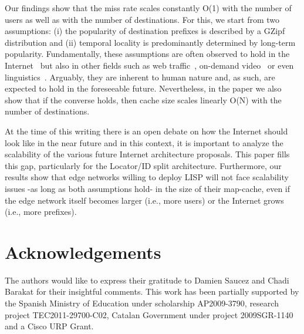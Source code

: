 \documentclass[twocolumn, 10pt]{article}
\theoremstyle{plain}
\begin{document}
Our findings show that the miss rate scales constantly O(1) with the number of
users as well as with the number of destinations. For this, we start from two
assumptions: (i) the popularity of destination prefixes is described by a
GZipf distribution and (ii) temporal locality is predominantly determined by
long-term popularity. Fundamentally, these assumptions are often observed to
hold in the Internet~\cite{sarrar:leverage_zipf, kim:rcaching} but also in
other fields such as web traffic~\cite{breslau:web_and_zipf}, on-demand
video~\cite{cha:itube} or even linguistics~\cite{zipf:principle_least_effort}.
Arguably, they are inherent to human nature and, as such, are expected to hold
in the foreseeable future. Nevertheless, in the paper we also show that if the
converse holds, then cache size scales linearly O(N) with the number of
destinations.

At the time of this writing there is an open debate on how the Internet should
look like in the near future and in this context, it is important to analyze
the scalability of the various future Internet architecture proposals. This
paper fills this gap, particularly for the Locator/ID split architecture.
Furthermore, our results show that edge networks willing to deploy LISP will
not face scalability issues -as long as both assumptions hold- in the size of
their map-cache, even if the edge network itself becomes larger (i.e., more
users) or the Internet grows (i.e., more prefixes).
 
\section*{Acknowledgements} 
The authors would like to express their gratitude to Damien Saucez and Chadi
Barakat for their insightful comments. This work has been partially supported
by the Spanish Ministry of Education under scholarship AP2009-3790, research
project TEC2011-29700-C02, Catalan Government under project 2009SGR-1140 and a
Cisco URP Grant.
\end{document}
